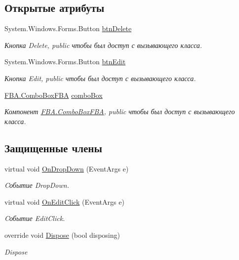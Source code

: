 \subsection*{Открытые атрибуты}
\begin{DoxyCompactItemize}
\item 
System.\+Windows.\+Forms.\+Button \mbox{\hyperlink{class_f_b_a_1_1_sys_d_b_edit_aa32c11601037955b3c19a6aa3a889109}{btn\+Delete}}
\begin{DoxyCompactList}\small\item\em Кнопка Delete, public чтобы был доступ с вызывающего класса. \end{DoxyCompactList}\item 
System.\+Windows.\+Forms.\+Button \mbox{\hyperlink{class_f_b_a_1_1_sys_d_b_edit_a915b06dd2badb68f00940c6b72c1d3a4}{btn\+Edit}}
\begin{DoxyCompactList}\small\item\em Кнопка Edit, public чтобы был доступ с вызывающего класса. \end{DoxyCompactList}\item 
\mbox{\hyperlink{class_f_b_a_1_1_combo_box_f_b_a}{F\+B\+A.\+Combo\+Box\+F\+BA}} \mbox{\hyperlink{class_f_b_a_1_1_sys_d_b_edit_ad5e31c513dbdd736a9130300cb6c5807}{combo\+Box}}
\begin{DoxyCompactList}\small\item\em Компонент \mbox{\hyperlink{class_f_b_a_1_1_combo_box_f_b_a}{F\+B\+A.\+Combo\+Box\+F\+BA}}, public чтобы был доступ с вызывающего класса. \end{DoxyCompactList}\end{DoxyCompactItemize}
\subsection*{Защищенные члены}
\begin{DoxyCompactItemize}
\item 
virtual void \mbox{\hyperlink{class_f_b_a_1_1_sys_d_b_edit_a570a27be3be8242a8a47f8a90dfffc18}{On\+Drop\+Down}} (Event\+Args e)
\begin{DoxyCompactList}\small\item\em Cобытие Drop\+Down. \end{DoxyCompactList}\item 
virtual void \mbox{\hyperlink{class_f_b_a_1_1_sys_d_b_edit_a8c75cc2a6eb78a19a152bf9d64766c38}{On\+Edit\+Click}} (Event\+Args e)
\begin{DoxyCompactList}\small\item\em Cобытие Edit\+Click. \end{DoxyCompactList}\item 
override void \mbox{\hyperlink{class_f_b_a_1_1_sys_d_b_edit_a92ebba63c241ca90599192bd5e2fd244}{Dispose}} (bool disposing)
\begin{DoxyCompactList}\small\item\em Dispose \end{DoxyCompactList}\end{DoxyCompactItemize}
